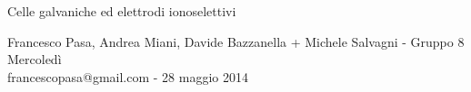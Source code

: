 \documentclass[11pt, twoside, a4paper]{article}
\begin{document}
\begin{center}

        {\huge Celle galvaniche ed elettrodi ionoselettivi}
    \vspace{0.1cm}

      	{Francesco Pasa, Andrea Miani, Davide Bazzanella + Michele Salvagni - Gruppo 8 Mercoledì} \\
      	{francescopasa@gmail.com - 28 maggio 2014}
    \vspace{-0.2cm}

\end{center}





\end{document}
